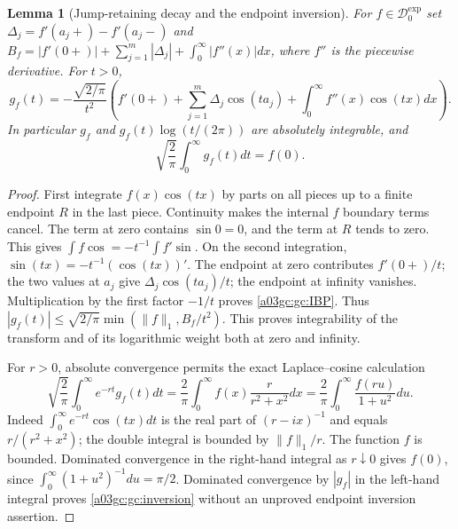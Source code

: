 \documentclass[11pt,a4paper]{article}
\newtheorem{lemma}[theorem]{Lemma}
\begin{document}
\begin{lemma}[Jump-retaining decay and the endpoint inversion]
For $f\in\mathcal D_0^{\exp}$ set
$\Delta_j=f'(a_j+)-f'(a_j-)$ and
$B_f=|f'(0+)|+\sum_{j=1}^m|\Delta_j|+\int_0^\infty|f''(x)|dx$,
where $f''$ is the piecewise derivative.  For $t>0$,
\begin{equation}
 g_f(t)=-\frac{\sqrt{2/\pi}}{t^2}
 \left(f'(0+)+\sum_{j=1}^m\Delta_j\cos(ta_j)
                   +\int_0^\infty f''(x)\cos(tx)dx\right).
 \label{a03gc:gc:IBP}
\end{equation}
In particular $g_f$ and $g_f(t)\log(t/(2\pi))$ are absolutely integrable,
and
\begin{equation}
 \sqrt{\frac2\pi}\int_0^\infty g_f(t)dt=f(0).
 \label{a03gc:gc:inversion}
\end{equation}
\end{lemma}
\begin{proof}
First integrate $f(x)\cos(tx)$ by parts on all pieces up to a finite
endpoint $R$ in the last piece.  Continuity makes the internal $f$
boundary terms cancel.  The term at zero contains $\sin0=0$, and the
term at $R$ tends to zero.  This gives
$\int f\cos=-t^{-1}\int f'\sin$.
On the second integration, $\sin(tx)=-t^{-1}(\cos(tx))'$.
The endpoint at zero contributes $f'(0+)/t$; the two values at $a_j$
give $\Delta_j\cos(ta_j)/t$; the endpoint at infinity vanishes.
Multiplication by the first factor $-1/t$ proves \eqref{a03gc:gc:IBP}.
Thus
$|g_f(t)|\le\sqrt{2/\pi}\min(\|f\|_1,B_f/t^2)$.
This proves integrability of the transform and of its logarithmic weight
both at zero and infinity.

For $r>0$, absolute convergence permits the exact Laplace--cosine
calculation
\begin{equation}
 \sqrt{\frac2\pi}\int_0^\infty e^{-rt}g_f(t)dt
  =\frac2\pi\int_0^\infty f(x)\frac{r}{r^2+x^2}dx
  =\frac2\pi\int_0^\infty\frac{f(ru)}{1+u^2}du.
 \label{a03gc:gc:Poisson}
\end{equation}
Indeed $\int_0^\infty e^{-rt}\cos(tx)dt$
is the real part of $(r-ix)^{-1}$ and equals $r/(r^2+x^2)$;
the double integral is bounded by $\|f\|_1/r$.
The function $f$ is bounded.  Dominated convergence in the right-hand
integral as $r\downarrow0$ gives $f(0)$, since
$\int_0^\infty(1+u^2)^{-1}du=\pi/2$.
Dominated convergence by $|g_f|$ in the left-hand integral proves
\eqref{a03gc:gc:inversion} without an unproved endpoint inversion assertion.
\end{proof}
\end{document}
